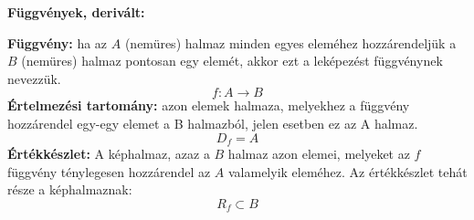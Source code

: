 \documentclass[12pt,a4paper]{article}
\begin{document}
\textbf{Függvények, derivált:}

\begin{tcolorbox}[colback=green!5!white,colframe=green!60!black,title= 1. Függvények{,} értelmezési tartomány{,} értékkészlet]
        \textbf{Függvény:} ha az \(A\) (nemüres) halmaz minden egyes eleméhez hozzárendeljük a \(B\)
        (nemüres) halmaz pontosan egy elemét, akkor ezt a leképezést függvénynek nevezzük.
        $$f:A \to B$$
        \textbf{Értelmezési tartomány:} azon elemek halmaza, melyekhez a függvény hozzárendel
        egy-egy elemet a B halmazból, jelen esetben ez az A halmaz.
        $$D_f = A$$
        \textbf{Értékkészlet:} A képhalmaz, azaz a \(B\) halmaz azon elemei, melyeket az \(f\) függvény
        ténylegesen hozzárendel az \(A\) valamelyik eleméhez. Az értékkészlet tehát része a képhalmaznak:
        $$R_f \subset B$$
\end{tcolorbox}
\end{document}
